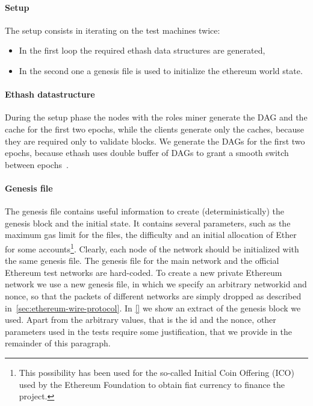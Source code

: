 \paragraph{Setup}
The setup consists in iterating on the test machines twice:
\begin{itemize}
\item In the first loop the required ethash data structures are generated,
\item In the second one a genesis file is used to initialize the
ethereum world state.
\end{itemize}


\paragraph{Ethash datastructure}

During the setup phase the nodes with the roles miner generate the
DAG and the cache for the first two epochs, while the clients generate only
the caches, because they are required only to validate blocks.
We generate the DAGs for the first two epochs, because ethash uses double
buffer of DAGs to grant a smooth switch between
epochs~\cite{bib:dagger-hashimoto}.



\paragraph{Genesis file}

The genesis file contains useful information to create (deterministically)
the genesis block and the initial state. It contains several parameters, such as
the maximum gas limit for the files, the difficulty and an initial allocation of
Ether for some accounts\footnote{This possibility has been used for the
so-called Initial Coin Offering (ICO) used by the Ethereum Foundation to obtain
fiat currency to finance the project.}. Clearly, each node of the network should
be initialized with the same genesis file. The genesis file for the main network
and the official Ethereum test networks are hard-coded. To create a new private
Ethereum network we use a new genesis file, in which we specify an arbitrary
networkid and nonce, so that the packets of different networks are simply
dropped as described in~\autoref{sec:ethereum-wire-protocol}.
In \autoref{} we show an extract of the genesis block we used.
Apart from the arbitrary values, that is the id and the nonce, other parameters
used in the tests require some justification, that we provide in the remainder of
this paragraph.

